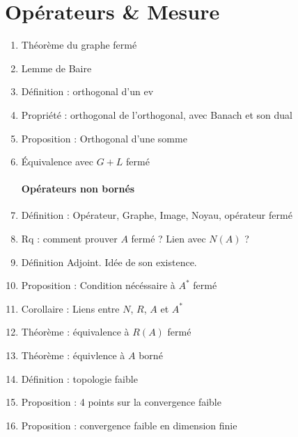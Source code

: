 \documentclass{article}
\begin{document}
\part{Opérateurs \& Mesure}
\begin{enumerate}
\section{Opérateur}
\subsection{Premiers résultats}
	\item Théorème du graphe fermé
	\item Lemme de Baire
	\item Définition : orthogonal d'un ev
	\item Propriété : orthogonal de l'orthogonal, avec Banach et son dual
	\item Proposition : Orthogonal d'une somme
	\item Équivalence avec $G+L$ fermé
\subsection{Opérateurs non bornés}
	\item Définition : Opérateur, Graphe, Image, Noyau, opérateur fermé
	\item Rq : comment prouver $A$ fermé ? Lien avec $N(A)$ ?
	\item Définition Adjoint. Idée de son existence.
	\item Proposition : Condition nécéssaire à $A^*$ fermé
	\item Corollaire : Liens entre $N$, $R$, $A$ et $A^*$
	\item Théorème : équivalence à $R(A)$ fermé
	\item Théorème : équivlence à $A$ borné
	\item Définition : topologie faible
	\item Proposition : 4 points sur la convergence faible
	\item Proposition : convergence faible en dimension finie

\end{enumerate}
\end{document}
